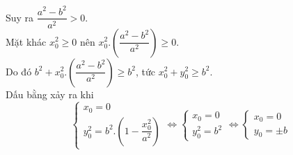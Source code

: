 \begin{bt}
{\begin{enumerate}[a)]
Suy ra $\dfrac{a^2-b^2}{a^2} >0$.\\
Mặt khác $x_0^2 \geq 0$ nên $x_0^2.\left( \dfrac{a^2-b^2}{a^2}\right) \geq 0$.\\
Do đó $b^2 +x_0^2.\left( \dfrac{a^2-b^2}{a^2}\right) \geq b^2$, tức $x_{0}^{2}+y_{0}^{2} \geq b^2.$\\
Dấu bằng xảy ra khi \[\left\{ {\begin{array}{*{20}{c}}
  {{x_0} = 0} \\ 
  {y_0^2 = {b^2}.\left( {1 - \dfrac{{x_0^2}}{{{a^2}}}} \right)} 
\end{array}} \right. \Leftrightarrow \left\{ {\begin{array}{*{20}{c}}
  {{x_0} = 0} \\ 
  {y_0^2 = {b^2}} 
\end{array}} \right. \Leftrightarrow \left\{ {\begin{array}{*{20}{c}}
  {{x_0} = 0} \\ 
  {{y_0} =  \pm b} 
\end{array}} \right.\]


\end{enumerate}}
\end{bt}
